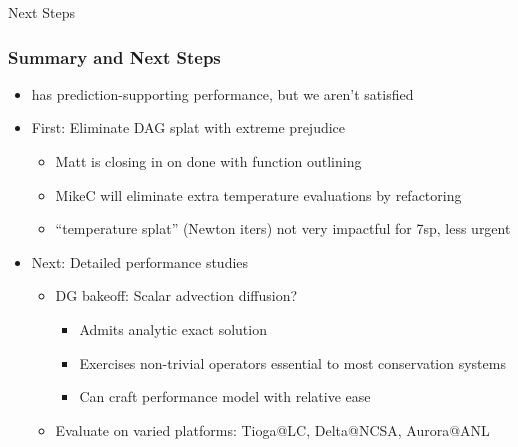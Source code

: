 \begin{frame}
    \centering
    \Large
    Next Steps
\end{frame}

\begin{frame}\frametitle{Summary and Next Steps}
\begin{itemize}
\item \mirgecom{} has prediction-supporting performance, but we aren't satisfied
\item First: Eliminate DAG splat with extreme prejudice
\begin{itemize}
\item Matt is closing in on done with function outlining
\item MikeC will eliminate extra temperature evaluations by refactoring
\item ``temperature splat'' (Newton iters) not very impactful for 7sp, less urgent
\end{itemize}
\item Next: Detailed performance studies
\begin{itemize}
\item DG bakeoff: Scalar advection diffusion?
\begin{itemize}
\item Admits analytic exact solution
\item Exercises non-trivial operators essential to most conservation systems
\item Can craft performance model with relative ease
\end{itemize}
\item Evaluate on varied platforms: Tioga@LC, Delta@NCSA, Aurora@ANL
\end{itemize}
\end{itemize}
\end{frame}

%

